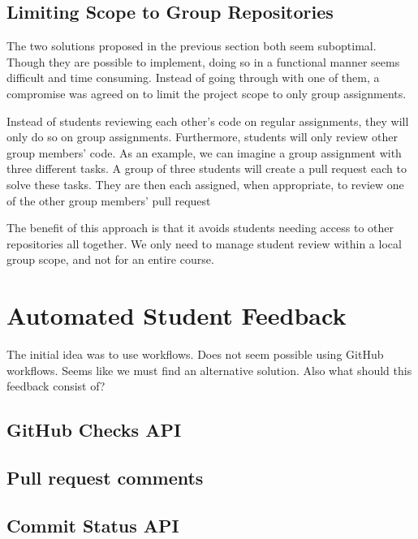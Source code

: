 \subsection{Limiting Scope to Group Repositories}

The two solutions proposed in the previous section both seem suboptimal.
Though they are possible to implement, doing so in a functional manner seems difficult and time consuming.
Instead of going through with one of them, a compromise was agreed on to limit the project scope to only group assignments.

Instead of students reviewing each other's code on regular assignments, they will only do so on group assignments.
Furthermore, students will only review other group members' code.
As an example, we can imagine a group assignment with three different tasks.
A group of three students will create a pull request each to solve these tasks.
They are then each assigned, when appropriate, to review one of the other group members' pull request

The benefit of this approach is that it avoids students needing access to other repositories all together.
We only need to manage student review within a local group scope, and not for an entire course.

\section{Automated Student Feedback}

The initial idea was to use workflows.
Does not seem possible using GitHub workflows. 
Seems like we must find an alternative solution.
Also what should this feedback consist of?

\subsection{GitHub Checks API}

\subsection{Pull request comments}

\subsection{Commit Status API}
